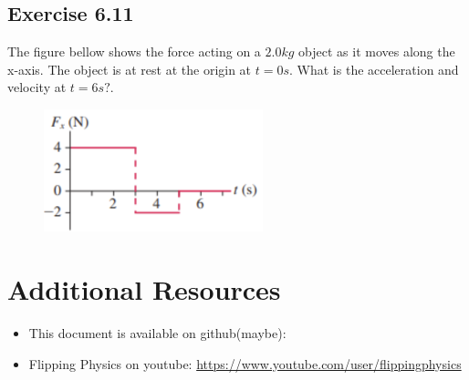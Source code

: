 \documentclass[11pt]{article}
\newenvironment{exercise}{
    \begin{mdframed}[style=problemstyle]\textcolor{black}{}
}{
    \end{mdframed}
}
\begin{document}
\subsection*{Exercise 6.11}
\begin{exercise}
    The figure bellow shows the force acting on a $2.0kg$ object as it moves
    along the x-axis. The object is at rest at the origin at $t=0s$. What 
    is the acceleration and velocity at $t=6s?$.
\end{exercise}
\begin{figure}[ht!]
    \centering
    \includegraphics[width=2.5in]{images/figure6_11.png}
\end{figure}


\section*{Additional Resources}
\begin{itemize}
    \item This document is available on github(maybe): 
    \item Flipping Physics on youtube: 
        \url{https://www.youtube.com/user/flippingphysics} 
\end{itemize}
\end{document}
